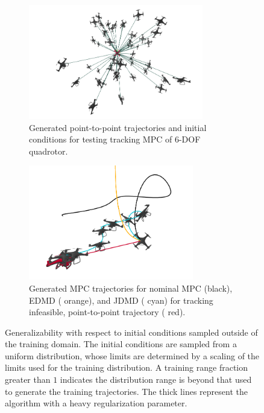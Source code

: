 \documentclass{article}
\begin{document}
\begin{figure}[t] \centering
	\begin{subfigure}[t]{0.49\textwidth}
		\centering
		\includegraphics[width=\textwidth,height=5cm]{full_quadrotor_test_linear_trajectories.png}
		\caption{Generated point-to-point trajectories and initial conditions for testing
		tracking MPC of 6-DOF quadrotor.}
		\label{fig:rex_full_quadrotor_initial_conditions}
	\end{subfigure}
	\hfill
	\begin{subfigure}[t]{0.49\textwidth}
		\raggedright
		\includegraphics[width=\textwidth, height=5cm]{jdmd_full_quad_pointtopoint_with_waypoints.png}
		\caption{Generated MPC trajectories for nominal MPC (black), EDMD (\color{orange}
		orange\color{black}), and JDMD (\color{cyan} cyan\color{black}) for tracking infeasible,
		point-to-point trajectory (\color{red} red\color{black}).}
		\label{fig:jdmd_full_quad_pointtopoint_with_waypoints}
	\end{subfigure}
	\caption{Generalizability with respect to initial conditions sampled outside of the 
		training domain. The initial conditions are sampled from a uniform distribution, whose 
		limits are determined by a scaling of the limits used for the training distribution. 
		A training range fraction greater than $1$ indicates the
		distribution range is beyond that used to generate the training trajectories. The thick 
		lines represent the algorithm with a heavy regularization parameter.
	}
	\label{fig:training_window}
\end{figure}
\end{document}
